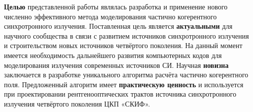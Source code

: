 
\textbf{Целью} представленной работы являлась разработка и применение нового численно эффективного метода моделирования частично когерентного синхротронного излучения. Поставленная цель является \textbf{актуальными} для научного сообщества в связи с развитием источников синхротронного излучения и строительством новых источников четвёртого поколения. На данный момент имеется необходимость дальнейшего развития компьютерных кодов для моделирования излучения современных источников СИ. Научная \textbf{новизна} заключается в разработке уникального алгоритма расчёта частично когерентного поля. Предложенный алгоритм имеет \textbf{практическую ценность} и используется при проектировании рентгенооптических трактов источника синхротронного излучения четвёртого поколения ЦКП «СКИФ». 


%
%




